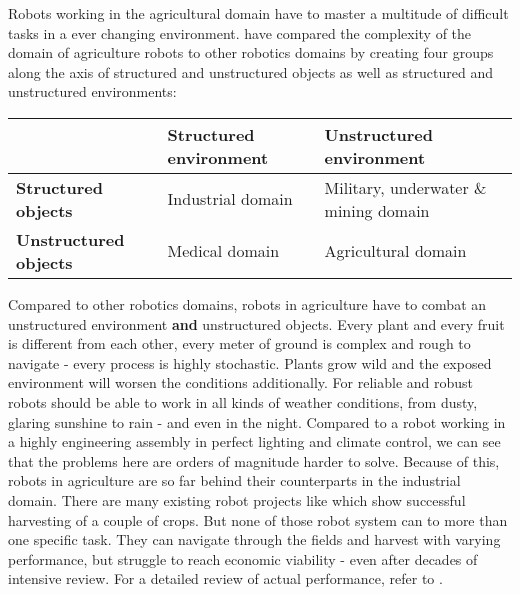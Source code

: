     Robots working in the agricultural domain have to master a multitude of difficult tasks in a ever changing environment. \cite{Bechar2016} have compared the complexity of the domain of agriculture robots to other robotics domains by creating four groups along the axis of structured and unstructured objects as well as structured and unstructured environments: 
    \begin{table}[h]
         \label{table:objects_and_tasks} 
        \begin{tabular}{@{}lll@{}}
        \toprule
                             & \textbf{Structured environment} & \textbf{Unstructured environment}                      \\ \midrule
        \textbf{Structured objects}   & Industrial domain      & Military, underwater \& mining domain \\
        \textbf{Unstructured objects} & Medical domain         & Agricultural domain                           \\ \bottomrule
        \end{tabular}
        \end{table}

    Compared to other robotics domains, robots in agriculture have to combat an unstructured environment \textbf{and} unstructured objects. Every plant and every fruit is different from each other, every meter of ground is complex and rough to navigate - every process is highly stochastic. Plants grow wild and the exposed environment will worsen the conditions additionally. For reliable and robust robots should be able to work in all kinds of weather conditions, from dusty, glaring sunshine to rain - and even in the night. Compared to a robot working in a highly engineering assembly in perfect lighting and climate control, we can see that the problems here are orders of magnitude harder to solve. 
    Because of this, robots in agriculture are so far behind their counterparts in the industrial domain. There are many existing robot projects like \cite{Arad2020, Chamanbaz2017, ConesaMunoz2015, Herck2020, Lehnert2020, Wu2020} which show successful harvesting of a couple of crops. But none of those robot system can to more than one specific task. They can navigate through the fields and harvest with varying performance, but struggle to reach economic viability - even after decades of intensive review. For a detailed review of actual performance, refer to \cite{Bac2014, Bechar2017}.

